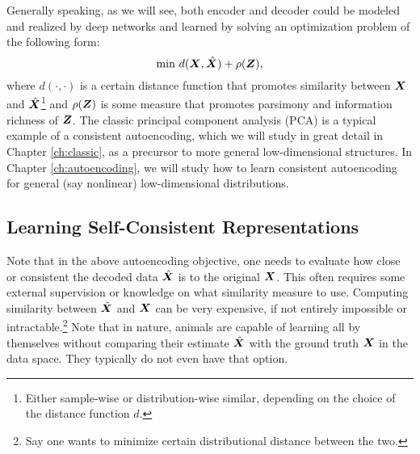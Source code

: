 \documentclass[\toplevelprefix/book-main.tex]{subfiles}
\begin{document}
Generally speaking, as we will see, both encoder and decoder could be modeled and realized by deep networks and learned by solving an optimization problem of the following form:
\begin{equation}
   \min \, d( \bm{X}, \hat {\bm{X}}) + \rho(\bm{Z}), 
   \label{eqn:auto-encoding-objective}
\end{equation}
where $d(\cdot, \cdot)$ is a certain distance function that promotes similarity between $\bm{X}$ and $\hat {\bm{X}}$\footnote{Either sample-wise or distribution-wise similar, depending on the choice of the distance function $d$.} and $\rho(\bm{Z})$ is some measure that promotes parsimony and information richness of $\bm{Z}$. The classic principal component analysis (PCA) \cite{JolliffeI2002} is a typical example of a consistent autoencoding, which we will study in great detail in Chapter \ref{ch:classic}, as a precursor to more general low-dimensional structures. In Chapter \ref{ch:autoencoding}, we will study how to learn consistent autoencoding for general (say nonlinear) low-dimensional distributions.  


\subsection{Learning Self-Consistent Representations}
Note that in the above autoencoding objective, one needs to evaluate how close or consistent the decoded data $\hat {\bm{X}}$ is to the original $\bm{X}$. This often requires some external supervision or knowledge on what similarity measure to use. Computing similarity between $\hat {\bm{X}}$ and $\bm{X}$ can be very expensive, if not entirely impossible or intractable.\footnote{Say one wants to minimize certain distributional distance between the two.} Note that in nature, animals are capable of learning all by themselves without comparing their estimate $\hat {\bm{X}}$ with the ground truth $\bm{X}$ in the data space. They typically do not even have that option. 
\end{document}

